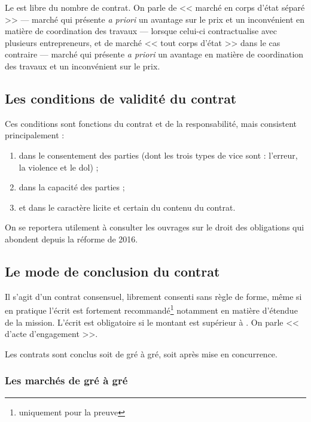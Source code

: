 		Le \Mo{} est libre du nombre de contrat. On parle de << marché en corps d'état séparé >> --- marché qui présente \emph{a priori} un avantage sur le prix et un inconvénient en matière de coordination des travaux --- lorsque celui-ci contractualise avec plusieurs entrepreneurs, et de marché << tout corps d'état >> dans le cas contraire --- marché qui présente \emph{a priori} un avantage en matière de coordination des travaux et un inconvénient sur le prix.
	
		\subsection{Les conditions de validité du contrat}
		
		Ces conditions sont fonctions du contrat et de la responsabilité, mais consistent principalement :
		\begin{enumerate}
			\item dans le consentement des parties (dont les trois types de vice sont : l'erreur, la violence et le dol) ;
			\item dans la capacité des parties ;
			\item et dans le caractère licite et certain du contenu du contrat.
		\end{enumerate}
		
		\begin{conseil}
			On se reportera utilement à consulter les ouvrages sur le droit des obligations qui abondent depuis la réforme de 2016.
		\end{conseil}
		
		\subsection{Le mode de conclusion du contrat}
		
			Il s'agit d'un contrat consensuel, librement consenti sans règle de forme, même si en pratique l'écrit est fortement recommandé\footnote{uniquement pour la preuve} notamment en matière d'étendue de la mission. L'écrit est obligatoire si le montant est supérieur à . On parle << d'acte d'engagement >>.
			
			Les contrats sont conclus soit de gré à gré, soit après mise en concurrence.
		
			\subsubsection{Les marchés de gré à gré}
			
